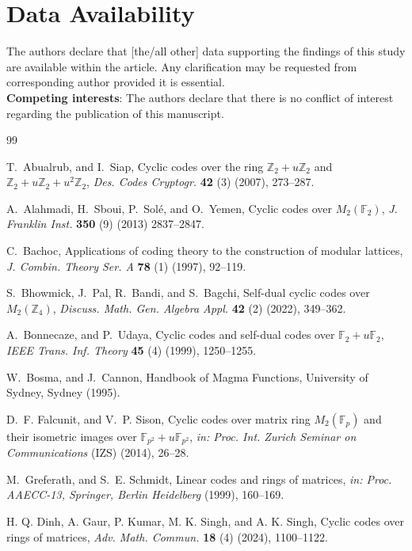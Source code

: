 \documentclass{amsart}
\theoremstyle{definition}
\theoremstyle{remark}
\numberwithin{equation}{section}
\begin{document}
\section*{Data Availability}
The authors declare that [the/all other] data supporting the findings of this study are available within the article. Any clarification may be requested from corresponding author provided it is essential. \\
\textbf{Competing interests}: The authors declare that there is no conflict of interest regarding the publication of this manuscript.\
\

  
  


\begin{thebibliography}{99}
		
T.~Abualrub, and I.~Siap,
Cyclic codes over the ring $\mathbb{Z}_2+u\mathbb{Z}_2$ and $\mathbb{Z}_2+u\mathbb{Z}_2+u^2\mathbb{Z}_2$,
\textit{Des. Codes Cryptogr.} \textbf{42} (3) (2007), 273--287.

A.~Alahmadi, H.~Sboui, P.~Sol\'e, and O.~Yemen,
Cyclic codes over $M_2(\mathbb{F}_2)$,
\textit{J. Franklin Inst.} \textbf{350} (9) (2013) 2837--2847.

C.~Bachoc,
Applications of coding theory to the construction of modular lattices,
\textit{J. Combin. Theory Ser. A} \textbf{78} (1) (1997), 92--119.

S.~Bhowmick, J.~Pal, R.~Bandi, and S.~Bagchi,
Self-dual cyclic codes over $M_2(\mathbb{Z}_4)$,
\textit{Discuss. Math. Gen. Algebra Appl.} \textbf{42} (2) (2022), 349--362.

A.~Bonnecaze, and P.~Udaya,
Cyclic codes and self-dual codes over $\mathbb{F}_2+u\mathbb{F}_2$,
\textit{IEEE Trans. Inf. Theory} \textbf{45} (4) (1999), 1250--1255.

W.~Bosma, and J.~Cannon,
Handbook of Magma Functions,
University of Sydney, Sydney (1995).

D.~F. Falcunit, and V.~P. Sison,
Cyclic codes over matrix ring $M_2(\mathbb{F}_p)$ and their isometric images over $\mathbb{F}_{p^2}+u\mathbb{F}_{p^2}$,
\textit{in: Proc. Int. Zurich Seminar on Communications} (IZS) (2014), 26--28.

M.~Greferath, and S.~E. Schmidt,
Linear codes and rings of matrices,
\textit{in: Proc. AAECC-13, Springer, Berlin Heidelberg} (1999), 160--169.

H. Q. Dinh, A. Gaur, P. Kumar, M. K. Singh, and A. K. Singh,
Cyclic codes over rings of matrices,
\textit{Adv. Math. Commun.} \textbf{18} (4) (2024), 1100--1122.


\end{thebibliography}
\end{document}
